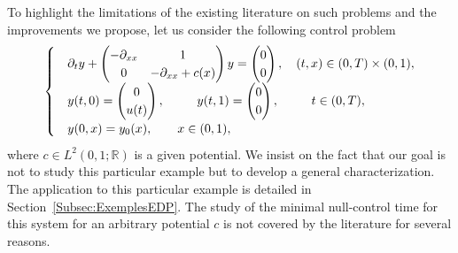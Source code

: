 \documentclass[AHL,Unicode,longabstracts]{cedram}
\newcommand{\R}{\mathbb{R}}
\begin{document}
To highlight the limitations of the existing literature on such problems and the improvements we propose, let us consider the following control problem
\begin{equation*}
\begin{cases}
& \partial_t y +
\begin{pmatrix} - \partial_{xx} & 1 \\ 0 & -\partial_{xx} + c(x)
\end{pmatrix} y =
\begin{pmatrix} 0 \\ 0
\end{pmatrix},
\quad (t,x) \in (0,T) \times (0,1),
\\
&y(t,0) =
\begin{pmatrix}
0 \\ u(t)
\end{pmatrix}, \mkern47mu y(t,1) =
\begin{pmatrix}
0 \\ 0
\end{pmatrix}, \quad \mkern 29mu t\in (0,T),
\\
&y(0,x) = y_0(x), \qquad x \in (0,1),
\end{cases}
\end{equation*}
where $c\in L^2(0,1;\R)$ is a given potential. We insist on the fact that our goal is not to study this particular example but to develop a general characterization. The application to this particular example is detailed in Section~\ref{Subsec:ExemplesEDP}. The study of the minimal null-control time for this system for an arbitrary potential $c$ is not covered by the literature for several reasons.
\end{document}
